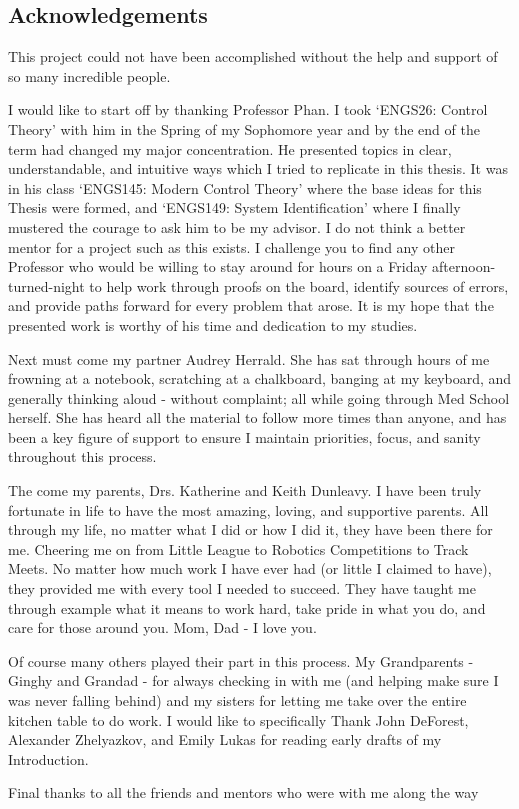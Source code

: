 \pagestyle{plain}
\begin{center}


\section*{Acknowledgements}


\end{center}
This project could not have been accomplished without the help and support of so many incredible people.

I would like to start off by thanking Professor Phan. I took `ENGS26: Control Theory' with him in the Spring of my Sophomore year and by the end of the term had changed my major concentration. He presented topics in clear, understandable, and intuitive ways which I tried to replicate in this thesis. It was in his class `ENGS145: Modern Control Theory' where the base ideas for this Thesis were formed, and `ENGS149: System Identification' where I finally mustered the courage to ask him to be my advisor. I do not think a better mentor for a project such as this exists. I challenge you to find any other Professor who would be willing to stay around for hours on a Friday afternoon-turned-night to help work through proofs on the board, identify sources of errors, and provide paths forward for every problem that arose. It is my hope that the presented work is worthy of his time and dedication to my studies.

Next must come my partner Audrey Herrald. She has sat through hours of me frowning at a notebook, scratching at a chalkboard, banging at my keyboard, and generally thinking aloud - without complaint; all while going through Med School herself. She has heard all the material to follow more times than anyone, and has been a key figure of support to ensure I maintain priorities, focus, and sanity throughout this process.

The come my parents, Drs. Katherine and Keith Dunleavy. I have been truly fortunate in life to have the most amazing, loving, and supportive parents. All through my life, no matter what I did or how I did it, they have been there for me. Cheering me on from Little League to Robotics Competitions to Track Meets. No matter how much work I have ever had (or little I claimed to have), they provided me with every tool I needed to succeed. They have taught me through example what it means to work hard, take pride in what you do, and care for those around you. Mom, Dad - I love you.

Of course many others played their part in this process. My Grandparents - Ginghy and Grandad - for always checking in with me (and helping make sure I was never falling behind) and my sisters for letting me take over the entire kitchen table to do work. I would like to specifically Thank John DeForest, Alexander Zhelyazkov, and Emily Lukas for reading early drafts of my Introduction. 

Final thanks to all the friends and mentors who were with me along the way
\cleardoublepage%
